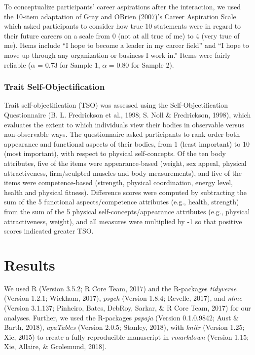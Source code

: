 \documentclass[man]{apa6}
\begin{document}
To conceptualize participants' career aspirations after the interaction,
we used the 10-item adaptation of Gray and OBrien (2007)'s Career
Aspiration Scale which asked participants to consider how true 10
statements were in regard to their future careers on a scale from 0 (not
at all true of me) to 4 (very true of me). Items include \enquote{I hope
to become a leader in my career field} and \enquote{I hope to move up
through any organization or business I work in.} Items were fairly
reliable (\(\alpha\) = 0.73 for Sample 1, \(\alpha\) = 0.80 for Sample
2).

\subsubsection{Trait
Self-Objectification}\label{trait-self-objectification}

Trait self-objectification (TSO) was assessed using the
Self-Objectification Questionnaire (B. L. Fredrickson et al., 1998; S.
Noll \& Fredrickson, 1998), which evaluates the extent to which
individuals view their bodies in observable versus non-observable ways.
The questionnaire asked participants to rank order both appearance and
functional aspects of their bodies, from 1 (least important) to 10 (most
important), with respect to physical self-concepts. Of the ten body
attributes, five of the items were appearance-based (weight, sex appeal,
physical attractiveness, firm/sculpted muscles and body measurements),
and five of the items were competence-based (strength, physical
coordination, energy level, health and physical fitness). Difference
scores were computed by subtracting the sum of the 5 functional
aspects/competence attributes (e.g., health, strength) from the sum of
the 5 physical self-concepts/appearance attributes (e.g., physical
attractiveness, weight), and all measures were multiplied by -1 so that
positive scores indicated greater TSO.

\section{Results}\label{results}

We used R (Version 3.5.2; R Core Team, 2017) and the R-packages
\emph{tidyverse} (Version 1.2.1; Wickham, 2017), \emph{psych} (Version
1.8.4; Revelle, 2017), and \emph{nlme} (Version 3.1.137; Pinheiro,
Bates, DebRoy, Sarkar, \& R Core Team, 2017) for our analyses. Further,
we used the R-packages \emph{papaja} (Version 0.1.0.9842; Aust \& Barth,
2018), \emph{apaTables} (Version 2.0.5; Stanley, 2018), with
\emph{knitr} (Version 1.25; Xie, 2015) to create a fully reproducible
manuscript in \emph{rmarkdown} (Version 1.15; Xie, Allaire, \&
Grolemund, 2018).
\end{document}
